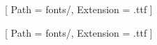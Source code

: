 \newfontfamily{}[%
  Path = fonts/,
  Extension = .ttf
]

\newfontfamily{}[%
  Path = fonts/,
  Extension = .ttf
]

